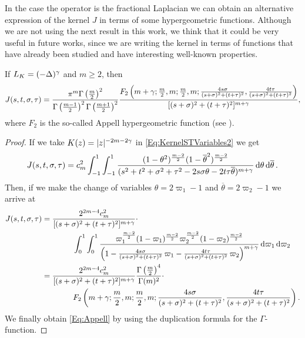 In the case the operator is the fractional Laplacian we can obtain an alternative expression of the kernel $J$ in terms of some hypergeometric functions. Although we are not using the next result in this work, we think that it could be very useful in future works, since we are writing the kernel in terms of functions that have already been studied and have interesting well-known properties.
\begin{lemma}
\label{Lemma:Appell} If $L_K = (-\Delta)^\gamma$ and $m\geq 2$, then
\begin{equation}
\label{Eq:Appell}
J(s,t,\sigma,\tau) = \frac{\pi^m\Gamma\left(\frac{m}{2}\right)^2}{\Gamma\left(\frac{m-1}{2}\right)^2\Gamma\left(\frac{m+1}{2}\right)^2} \frac{F_2\left( m+\gamma;\frac{m}{2},m;\frac{m}{2},m;\frac{4s\sigma}{(s+\sigma)^2+(t+\tau)^2},\frac{4t\tau}{(s+\sigma)^2+(t+\tau)^2} \right)}{[(s+\sigma)^2+(t+\tau)^2]^{m+\gamma}},
\end{equation}
where $F_2$ is the so-called Appell hypergeometric function (see \cite{Appell}).
\end{lemma}



\begin{proof}
If we take $K(z) = |z|^{-2m-2\gamma}$ in \eqref{Eq:KernelSTVariables2} we get
\begin{align*}
J(s,t,\sigma, \tau) = c_m ^2  \int_{-1}^1  \int_{-1}^1  \frac{(1-\theta^2)^{\frac{m-2}{2}} (1-\overline{\theta}^2)^{\frac{m-2}{2}}}{(s^2 + t^2 + \sigma^2 + \tau^2 -2 s \sigma \theta -2 t \tau \overline{\theta})^{m+\gamma}} \,\mathrm{d} \theta \,\mathrm{d} \overline{\theta}\,.
\end{align*}
Then, if we make the change of variables $\theta = 2\varpi_1-1$ and $\overline{\theta}=2\varpi_2-1$
we arrive at
\begin{align*}
J(s,t,\sigma, \tau) &= \frac{2^{2m-4} c_m^2}{[(s+\sigma)^2+(t+\tau)^2]^{m+\gamma}} \cdot \\
 & \quad \quad \quad \quad  \int_0^1 \int_0^1
\frac{\varpi_1^\frac{m-2}{2} (1-\varpi_1)^\frac{m-2}{2} \varpi_2^\frac{m-2}{2}
(1-\varpi_2)^\frac{m-2}{2}}{\left(1-\frac{4s\sigma}{(s+\sigma)^2+(t+\tau)^2}\,\varpi_1-\frac{4t\tau}{(s+\sigma)^2+(t+\tau)^2}\,\varpi_2
\right)^{m+\gamma}} \,\mathrm{d} \varpi_1 \,\mathrm{d} \varpi_2 \\
&= \frac{2^{2m-4} c_m^2}{[(s+\sigma)^2+(t+\tau)^2]^{m+\gamma}} \frac{\Gamma\left(\frac{m}{2} \right)^4}{\Gamma(m)^2} \cdot \\
& \quad \quad \quad \quad F_2\left( m+\gamma;\frac{m}{2},m;\frac{m}{2},m;\frac{4s\sigma}{(s+\sigma)^2+(t+\tau)^2},\frac{4t\tau}{(s+\sigma)^2+(t+\tau)^2} \right).
\end{align*}
We finally obtain \eqref{Eq:Appell} by using the duplication formula for the $\Gamma$-function.
\end{proof}

